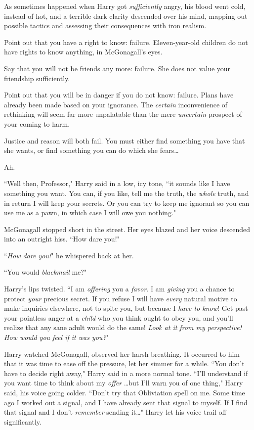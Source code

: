 As sometimes happened when Harry got \emph{sufficiently} angry, his blood went cold, instead of hot, and a terrible dark clarity descended over his mind, mapping out possible tactics and assessing their consequences with iron realism.

\begin{em}
Point out that you have a right to know: failure. Eleven-year-old children do not have rights to know anything, in McGonagall's eyes.

Say that you will not be friends any more: failure. She does not value your friendship sufficiently.

Point out that you will be in danger if you do not know: failure. Plans have already been made based on your ignorance. The \emph{certain} inconvenience of rethinking will seem far more unpalatable than the mere \emph{uncertain} prospect of your coming to harm.

Justice and reason will both fail. You must either find something you have that she wants, or find something you can do which she fears{\ldots}
\end{em}

Ah.

``Well then, Professor," Harry said in a low, icy tone, ``it sounds like I have something you want. You can, if you like, tell me the truth, the \emph{whole} truth, and in return I will keep your secrets. Or you can try to keep me ignorant so you can use me as a pawn, in which case I will owe you nothing."

McGonagall stopped short in the street. Her eyes blazed and her voice descended into an outright hiss. ``How dare you!"

``\emph{How dare you!}" he whispered back at her.

``You would \emph{blackmail} me?"

Harry's lips twisted. ``I am \emph{offering} you a \emph{favor}. I am \emph{giving} you a chance to protect \emph{your} precious secret. If you refuse I will have \emph{every} natural motive to make inquiries elsewhere, not to spite you, but because I \emph{have to know}! Get past your pointless anger at a \emph{child} who you think ought to obey you, and you'll realize that any sane adult would do the same! \emph{Look at it from my perspective! How would you feel if it was \emph{you}?}"

Harry watched McGonagall, observed her harsh breathing. It occurred to him that it was time to ease off the pressure, let her simmer for a while. ``You don't have to decide right away," Harry said in a more normal tone. ``I'll understand if you want time to think about my \emph{offer} {\ldots}but I'll warn you of one thing," Harry said, his voice going colder. ``Don't try that Obliviation spell on me. Some time ago I worked out a signal, and I have already sent that signal to myself. If I find that signal and I don't \emph{remember} sending it{\ldots}" Harry let his voice trail off significantly.

